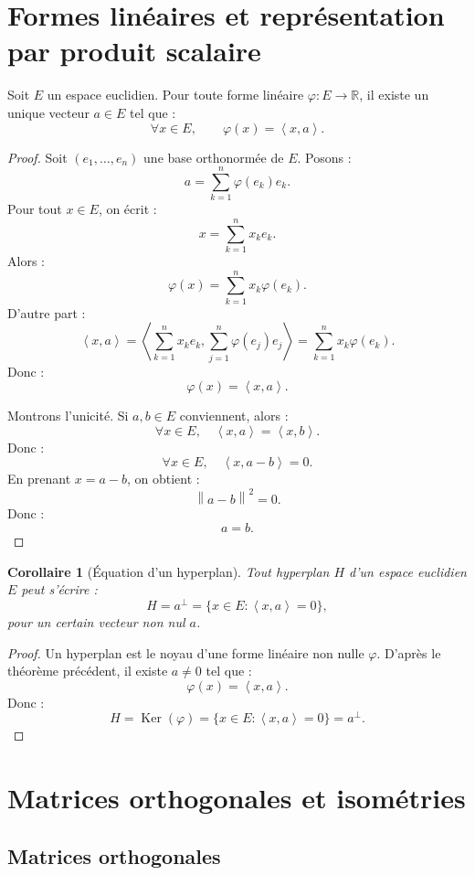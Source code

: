 \documentclass[11pt,a4paper]{article}
\newcommand{\R}{\mathbb R}
\newcommand{\Ker}{\operatorname{Ker}}
\newcommand{\norme}[1]{\left\lVert #1\right\rVert}
\newcommand{\scal}[2]{\left\langle #1,#2\right\rangle}
\newtheorem{corollaire}[prop]{Corollaire}
\begin{document}
\section{Formes linéaires et représentation par produit scalaire}

\begin{theorembox}
Soit \(E\) un espace euclidien.  
Pour toute forme linéaire \(\varphi:E\to\R\), il existe un unique vecteur \(a\in E\) tel que :
\[
\forall x\in E,\qquad \varphi(x)=\scal{x}{a}.
\]
\end{theorembox}

\begin{proof}
Soit \((e_1,\dots,e_n)\) une base orthonormée de \(E\).  
Posons :
\[
a=\sum_{k=1}^n \varphi(e_k)e_k.
\]
Pour tout \(x\in E\), on écrit :
\[
x=\sum_{k=1}^n x_ke_k.
\]
Alors :
\[
\varphi(x)
=
\sum_{k=1}^n x_k\varphi(e_k).
\]
D'autre part :
\[
\scal{x}{a}
=
\scal{\sum_{k=1}^n x_ke_k}{\sum_{j=1}^n\varphi(e_j)e_j}
=
\sum_{k=1}^n x_k\varphi(e_k).
\]
Donc :
\[
\varphi(x)=\scal{x}{a}.
\]

Montrons l'unicité.  
Si \(a,b\in E\) conviennent, alors :
\[
\forall x\in E,\quad \scal{x}{a}=\scal{x}{b}.
\]
Donc :
\[
\forall x\in E,\quad \scal{x}{a-b}=0.
\]
En prenant \(x=a-b\), on obtient :
\[
\norme{a-b}^2=0.
\]
Donc :
\[
a=b.
\]
\end{proof}

\begin{corollaire}[Équation d'un hyperplan]
Tout hyperplan \(H\) d'un espace euclidien \(E\) peut s'écrire :
\[
H=a^\perp=\{x\in E:\scal{x}{a}=0\},
\]
pour un certain vecteur non nul \(a\).
\end{corollaire}

\begin{proof}
Un hyperplan est le noyau d'une forme linéaire non nulle \(\varphi\).  
D'après le théorème précédent, il existe \(a\neq0\) tel que :
\[
\varphi(x)=\scal{x}{a}.
\]
Donc :
\[
H=\Ker(\varphi)=\{x\in E:\scal{x}{a}=0\}=a^\perp.
\]
\end{proof}

\section{Matrices orthogonales et isométries}

\subsection{Matrices orthogonales}
\end{document}
